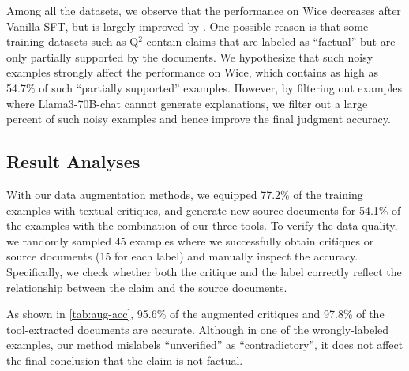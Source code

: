 Among all the datasets, we observe that the performance on Wice decreases after Vanilla SFT, but is largely improved by \fencemodelname. 
One possible reason is that some training datasets such as Q$^2$ contain claims that are labeled as ``factual'' but are only partially supported by the documents.
We hypothesize that such noisy examples strongly affect the performance on Wice, which contains as high as 54.7\% of such ``partially supported'' examples.
However, by filtering out examples where Llama3-70B-chat cannot generate explanations, we filter out a large percent of such noisy examples and hence improve the final judgment accuracy.



\subsection{Result Analyses}
With our data augmentation methods, we equipped 77.2\% of the training examples with textual critiques, and generate new source documents for 54.1\% of the examples with the combination of our three tools. 
To verify the data quality, we randomly sampled 45 examples where we successfully obtain critiques or source documents (15 for each label) and manually inspect the accuracy.
Specifically, we check whether both the critique and the label correctly reflect the relationship between the claim and the source documents.

As shown in \autoref{tab:aug-acc}, 95.6\% of the augmented critiques and 97.8\% of the tool-extracted documents are accurate. 
Although in one of the wrongly-labeled examples, our method mislabels ``unverified'' as ``contradictory'', it does not affect the final conclusion that the claim is not factual.

\begin{table}[t]
\centering
{}
\caption{
The accuracy of the critiques and the tool-extracted source documents we obtained. We randomly sampled 15 examples for each predicted label and manually check the accuracy of each example.
}
\label{tab:aug-acc}
\end{table}

